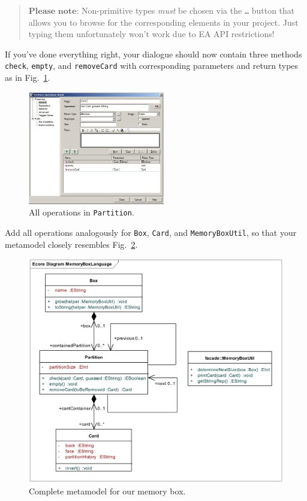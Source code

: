 \vspace{-.5cm}
\begin{quote}
$\textbf{Please note:}$ Non-primitive types \emph{must} be chosen via the
\texttt{\ldots} button that allows you to browse for the corresponding elements in your
project.  Just typing them unfortunately won't work due to EA API restrictions!
\end{quote}
\vspace{-.5cm}

If you've done everything right, your dialogue should
now contain three methods \texttt{check}, \texttt{empty}, and
\texttt{removeCard} with corresponding parameters and return types as in
Fig.~\ref{fig:operation_partition}.
\begin{figure}[htbp]
	\centering
  \includegraphics[width=0.53\textwidth]{pics/memBoxBilder/memBox39}
	\caption{All operations in \texttt{Partition}.}
	\label{fig:operation_partition}
\end{figure}
\clearpage

Add all operations analogously for \texttt{Box}, \texttt{Card}, and
\texttt{MemoryBoxUtil}, so that your metamodel closely resembles
Fig.~\ref{fig:metamodel_complete}. 
 
\begin{figure}[htbp]
	\centering 
  \includegraphics[width=\textwidth]{pics/memBoxBilder/memBox44} 
	\caption{Complete metamodel for our memory box.}
	\label{fig:metamodel_complete}
\end{figure}

